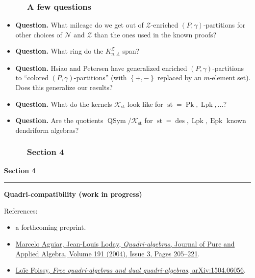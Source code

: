 \documentclass{beamer}
\newcommand{\red}{\color{red}}
\newcommand{\Lpk}{\operatorname{Lpk}}
\newcommand{\Pk}{\operatorname{Pk}}
\newcommand{\Epk}{\operatorname{Epk}}
\newcommand{\des}{\operatorname{des}}
\newcommand{\st}{\operatorname{st}}
\newcommand{\QSym}{\operatorname{QSym}}
\newcommand{\calN}{\mathcal{N}}
\newcommand{\calZ}{\mathcal{Z}}
\newcommand{\fti}[1]{\frametitle{\ \ \ \ \ #1}}
\newcommand{\set}[1]{\left\{ #1 \right\}}
\newcommand{\tup}[1]{\left( #1 \right)}
\theoremstyle{plain}
\begin{document}
\begin{frame}
\fti{A few questions}

\begin{itemize}

\item \textbf{Question.}
      What mileage do we get out of $\calZ$-enriched
      $\tup{P,\gamma}$-partitions for other choices of
      $\calN$ and $\calZ$ than the ones used in the known proofs?

\item \textbf{Question.}
      What ring do the $K^{\calZ}_{n,\Lambda}$ span?

\item \textbf{Question.}
      Hsiao and Petersen have generalized enriched
      $\tup{P, \gamma}$-partitions to ``colored
      $\tup{P, \gamma}$-partitions'' (with $\set{+,-}$
      replaced by an $m$-element set).
      Does this generalize our results?

\item \textbf{Question.}
      What do the kernels $\mathcal{K}_{\st}$ look like for
      $\st = \Pk, \Lpk, \ldots$?

\item \textbf{Question.}
      Are the quotients $\QSym / \mathcal{K}_{\st}$ for
      $\st = \des, \Lpk, \Epk$ known dendriform algebras?

\end{itemize}

\end{frame}

\begin{frame}
\fti{Section 4}
\begin{center}
{\LARGE \bf Section 4} \\
\noindent\rule[0.5ex]{\linewidth}{1pt}
{\Large \bf Quadri-compatibility (work in progress)}
\end{center}
\vspace{1cm}
References:
\begin{itemize}
\item a forthcoming preprint.
\item {\red \href{https://doi.org/10.1016/j.jpaa.2004.01.002}{Marcelo Aguiar, Jean-Louis Loday, \textit{Quadri-algebras}, Journal of Pure and Applied Algebra, Volume 191 (2004), Issue 3, Pages 205--221}}.
\item {\red \href{https://arxiv.org/abs/1504.06056}{Loïc Foissy, \textit{Free quadri-algebras and dual quadri-algebras}, arXiv:1504.06056}}.
\end{itemize}
\end{frame}
\end{document}
